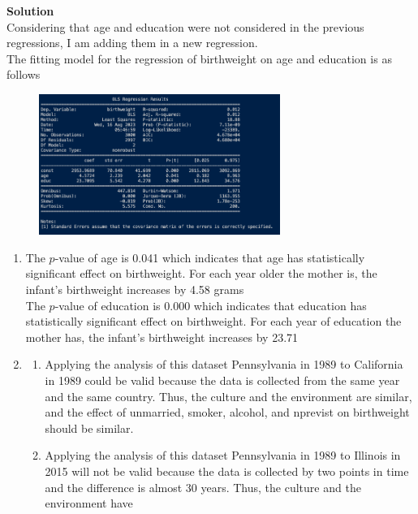 \documentclass{uofa-eng-assignment}
\begin{document}
\begin{enumerate}
        \textbf{Solution} \\
        Considering that age and education were not considered in the previous regressions, I am adding them in a new regression. \\
        The fitting model for the regression of birthweight on age and education is as follows
        \begin{figure}[H]
            \centering
            \includegraphics[width=0.70\textwidth]{p2-5.png}
        \end{figure}
        \begin{enumerate}
            \item The $p$-value of age is 0.041 which indicates that age has statistically
                  significant effect on birthweight. For each year older the mother is, the
                  infant's birthweight increases by 4.58 grams \\ The $p$-value of education is
                  0.000 which indicates that education has statistically significant effect on
                  birthweight. For each year of education the mother has, the infant's
                  birthweight increases by 23.71 \item
                  \begin{enumerate}
                      \item  Applying the analysis of this dataset Pennsylvania in 1989 to California in
                            1989 could be valid because the data is collected from the same year and the
                            same country. Thus, the culture and the environment are similar, and the effect
                            of unmarried, smoker, alcohol, and nprevist on birthweight should be similar.
                      \item Applying the analysis of this dataset Pennsylvania in 1989 to Illinois in 2015
                            will not be valid because the data is collected by two points in time and the
                            difference is almost 30 years. Thus, the culture and the environment have

\end{enumerate}
\end{enumerate}
\end{enumerate}
\end{document}
